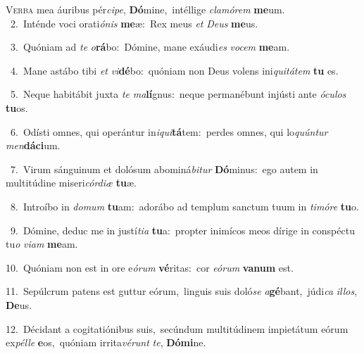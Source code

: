 \lettrine{\initial\textcolor{\initialcolor}{V}}{erba} mea áuribus pér\-\textit{ci}\-\textit{pe}, \textbf{Dó}\-mine,~\star intéllige \textit{cla}\-\textit{mó}\textit{rem} \textbf{me}\-um.\\
{\numbfont\textcolor{\numbcolor}{~2.}}~Inténde voci orati\-\textit{ó}\-\textit{nis} \textbf{me}\-æ:~\star Rex meus \textit{et} \textit{De}\-\textit{us} \textbf{me}\-us.\par
{\numbfont\textcolor{\numbcolor}{~3.}}~Quóniam ad \textit{te} \textit{o}\-\textbf{rá}bo:~\star Dómine, mane exáudi\textit{es} \textit{vo}\-\textit{cem} \textbf{me}\-am.\par
{\numbfont\textcolor{\numbcolor}{~4.}}~Mane astábo tibi \textit{et} \textit{vi}\-\textbf{dé}bo:~\star quóniam non Deus volens ini\-\textit{qui}\-\textit{tá}\textit{tem} \textbf{tu} es.\par
{\numbfont\textcolor{\numbcolor}{~5.}}~Neque habitábit juxta \textit{te} \textit{ma}\-\textbf{lí}gnus:~\star neque permanébunt injústi ante \textit{ó}\-\textit{cu}\textit{los} \textbf{tu}\-os.\par
{\numbfont\textcolor{\numbcolor}{~6.}}~Odísti omnes, qui operántur in\-\textit{i}\-\textit{qui}\textbf{tá}tem:~\star perdes omnes, qui lo\-\textit{quún}\-\textit{tur} \textit{men}\-\textbf{dá}\textbf{ci}um.\par
{\numbfont\textcolor{\numbcolor}{~7.}}~Virum sánguinum et dolósum abominá\-\textit{bi}\-\textit{tur} \textbf{Dó}\-minus:~\star ego autem in multitúdine miseri\-\textit{cór}\-\textit{di}\textit{æ} \textbf{tu}\-æ.\par
{\numbfont\textcolor{\numbcolor}{~8.}}~Introíbo in \textit{do}\-\textit{mum} \textbf{tu}\-am:~\star adorábo ad templum sanctum tuum in \textit{ti}\-\textit{mó}\textit{re} \textbf{tu}\-o.\par
{\numbfont\textcolor{\numbcolor}{~9.}}~Dómine, deduc me in justí\-\textit{ti}\-\textit{a} \textbf{tu}\-a:~\star propter inimícos meos dírige in conspéctu tu\textit{o} \textit{vi}\-\textit{am} \textbf{me}\-am.\par
{\numbfont\textcolor{\numbcolor}{10.}}~Quóniam non est in ore e\-\textit{ó}\-\textit{rum} \textbf{vé}\-ritas:~\star cor \textit{e}\-\textit{ó}\textit{rum} \textbf{va}\-\textbf{num} est.\par
{\numbfont\textcolor{\numbcolor}{11.}}~Sepúlcrum patens est guttur eórum,~\dagger linguis suis doló\textit{se} \textit{a}\-\textbf{gé}bant,~\star júdi\textit{ca} \textit{il}\-\textit{los}, \textbf{De}\-us.\par
{\numbfont\textcolor{\numbcolor}{12.}}~Décidant a cogitatiónibus suis,~\dagger secúndum multitúdinem impietátum eórum ex\-\textit{pél}\-\textit{le} \textbf{e}\-os,~\star quóniam irrita\-\textit{vé}\-\textit{runt} \textit{te}\-, \textbf{Dó}\-\textbf{mi}ne.\par
